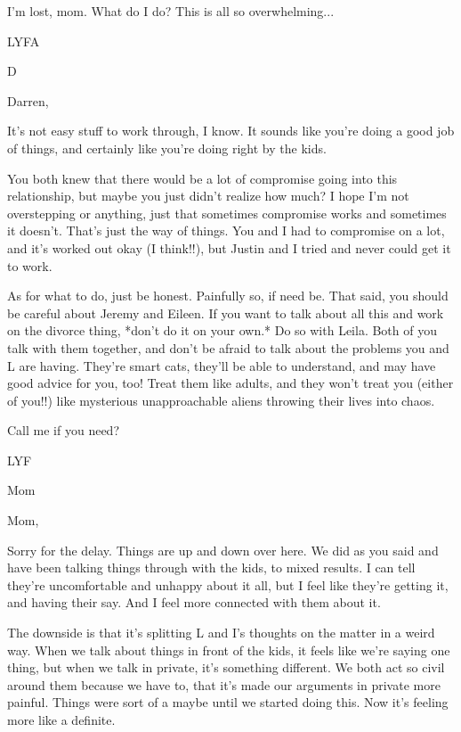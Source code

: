 I'm lost, mom. What do I do? This is all so overwhelming...

LYFA

D

\secdiv{}

\noindent Darren,

It's not easy stuff to work through, I know. It sounds like you're doing a good job of things, and certainly like you're doing right by the kids.

You both knew that there would be a lot of compromise going into this relationship, but maybe you just didn't realize how much? I hope I'm not overstepping or anything, just that sometimes compromise works and sometimes it doesn't. That's just the way of things. You and I had to compromise on a lot, and it's worked out okay (I think!!), but Justin and I tried and never could get it to work.

As for what to do, just be honest. Painfully so, if need be. That said, you should be careful about Jeremy and Eileen. If you want to talk about all this and work on the divorce thing, *don't do it on your own.* Do so with Leila. Both of you talk with them together, and don't be afraid to talk about the problems you and L are having. They're smart cats, they'll be able to understand, and may have good advice for you, too! Treat them like adults, and they won't treat you (either of you!!) like mysterious unapproachable aliens throwing their lives into chaos.

Call me if you need?

LYF

Mom

\secdiv{}

\noindent Mom,

Sorry for the delay. Things are up and down over here. We did as you said and have been talking things through with the kids, to mixed results. I can tell they're uncomfortable and unhappy about it all, but I feel like they're getting it, and having their say. And I feel more connected with them about it.

The downside is that it's splitting L and I's thoughts on the matter in a weird way. When we talk about things in front of the kids, it feels like we're saying one thing, but when we talk in private, it's something different. We both act so civil around them because we have to, that it's made our arguments in private more painful. Things were sort of a maybe until we started doing this. Now it's feeling more like a definite.

